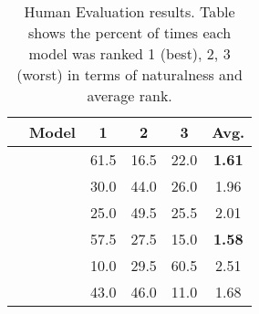 \begin{table}
    \centering
\begin{tabular}{ll c c c c }
\toprule
 & Model & 1 & 2 & 3 & Avg. \\
\midrule
    \parbox[t]{2mm}{}
 & \small{} & 61.5 & 16.5 & 22.0 & \textbf{1.61} \\
    & \small{}  & 30.0 & 44.0 & 26.0 & 1.96 \\
    & \small{} & 25.0 & 49.5 & 25.5 & 2.01 \\
\midrule
    \parbox[t]{2mm}{}
 & \small{} & 57.5 & 27.5 & 15.0 & \textbf{1.58} \\
      & \small{} & 10.0 & 29.5 & 60.5 & 2.51\\
      & \small{}  &  43.0 & 46.0 & 11.0 & 1.68\\
\bottomrule
\end{tabular}
\caption{Human Evaluation results. Table shows the percent of times each model was ranked 1 (best), 2, 3 (worst) in terms of naturalness and average rank.}
\label{tab:human}
\end{table}
